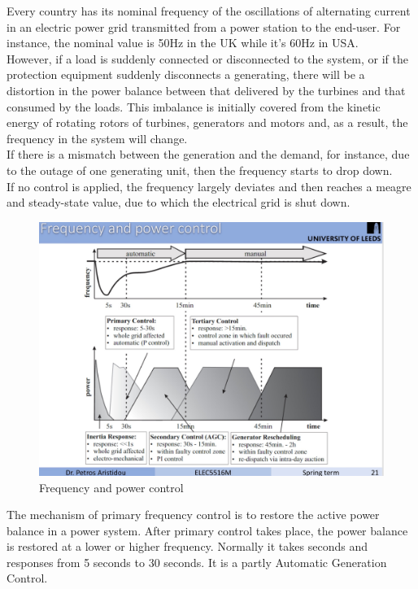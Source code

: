 \documentclass{report}
\begin{document}
Every country has its nominal frequency of the oscillations of alternating current in an electric power grid transmitted from a power station to the end-user. For instance, the nominal value is 50Hz in the UK while it’s 60Hz in USA.\\

However, if a load is suddenly connected or disconnected to the system, or if the protection equipment suddenly disconnects a generating, there will be a distortion in the power balance between that delivered by the turbines and that consumed by the loads. This imbalance is initially covered from the kinetic energy of rotating rotors of turbines, generators and motors and, as a result, the frequency in the system will change. \\

If there is a mismatch between the generation and the demand, for instance, due to the outage of one generating unit, then the frequency starts to drop down. \\

If no control is applied, the frequency largely deviates and then reaches a meagre and steady-state value, due to which the electrical grid is shut down.\\

\begin{figure}[htp]
\centering
\includegraphics[width = .8\textwidth]{Figure/leeds_freq_control.jpeg}
\caption{Frequency and power control}
\label{leeds_freq_control}
\end{figure}

The mechanism of primary frequency control is to restore the active power balance in a power system. After primary control takes place, the power balance is restored at a lower or higher frequency. Normally it takes seconds and responses from 5 seconds to 30 seconds. It is a partly Automatic Generation Control.\\
\end{document}
